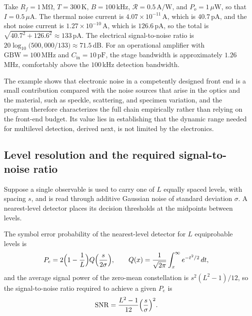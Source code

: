 \begin{example}\label{ex:tia}
Take $R_f=1\,\mathrm{M\Omega}$, $T=300\,\mathrm K$, $B=100\,\mathrm{kHz}$, $\mathcal R=0.5\,\mathrm{A/W}$, and $P_o=1\,\mu\mathrm W$, so that $I=0.5\,\mu\mathrm A$. The thermal noise current is $4.07\times10^{-11}\,\mathrm A$, which is $40.7$\,pA, and the shot noise current is $1.27\times10^{-10}\,\mathrm A$, which is $126.6$\,pA, so the total is $\sqrt{40.7^2+126.6^2}\approx133$\,pA. The electrical signal-to-noise ratio is $20\log_{10}\bigl(500{,}000/133\bigr)\approx71.5$\,dB. For an operational amplifier with $\mathrm{GBW}=100\,\mathrm{MHz}$ and $C_{\mathrm{in}}=10\,\mathrm{pF}$, the stage bandwidth is approximately $1.26$\,MHz, comfortably above the $100$\,kHz detection bandwidth.
\end{example}

The example shows that electronic noise in a competently designed front end is a small contribution compared with the noise sources that arise in the optics and the material, such as speckle, scattering, and specimen variation, and the program therefore characterizes the full chain empirically rather than relying on the front-end budget. Its value lies in establishing that the dynamic range needed for multilevel detection, derived next, is not limited by the electronics.

\subsection{Level resolution and the required signal-to-noise ratio}\label{sec:snr}

Suppose a single observable is used to carry one of $L$ equally spaced levels, with spacing $s$, and is read through additive Gaussian noise of standard deviation $\sigma$. A nearest-level detector places its decision thresholds at the midpoints between levels.

\begin{proposition}\label{prop:pam}
The symbol error probability of the nearest-level detector for $L$ equiprobable levels is
\[
P_e=2\Bigl(1-\frac1L\Bigr)Q\Bigl(\frac{s}{2\sigma}\Bigr),
\qquad Q(x)=\frac1{\sqrt{2\pi}}\int_x^\infty e^{-t^2/2}\,dt,
\]
and the average signal power of the zero-mean constellation is $s^2(L^2-1)/12$, so the signal-to-noise ratio required to achieve a given $P_e$ is
\[
\mathrm{SNR}=\frac{L^{2}-1}{12}\Bigl(\frac{s}{\sigma}\Bigr)^{2}.
\]
\end{proposition}

